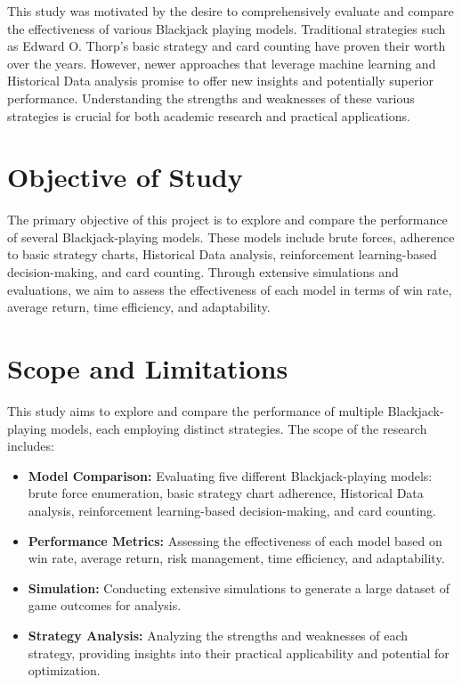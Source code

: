 \documentclass[a4paper,12pt]{report}
\begin{document}
This study was motivated by the desire to comprehensively evaluate and compare the effectiveness of various Blackjack playing models. Traditional strategies such as Edward O. Thorp's basic strategy and card counting have proven their worth over the years. However, newer approaches that leverage machine learning and Historical Data analysis promise to offer new insights and potentially superior performance. Understanding the strengths and weaknesses of these various strategies is crucial for both academic research and practical applications.

\section{Objective of Study} The primary objective of this project is to explore and compare the performance of several Blackjack-playing models. These models include brute forces, adherence to basic strategy charts, Historical Data analysis, reinforcement learning-based decision-making, and card counting. Through extensive simulations and evaluations, we aim to assess the effectiveness of each model in terms of win rate, average return, time efficiency, and adaptability.

\section{Scope and Limitations}
This study aims to explore and compare the performance of multiple Blackjack-playing models, each employing distinct strategies. The scope of the research includes:

\begin{itemize}
\item \textbf{Model Comparison:} Evaluating five different Blackjack-playing models: brute force enumeration, basic strategy chart adherence, Historical Data analysis, reinforcement learning-based decision-making, and card counting.
\item \textbf{Performance Metrics:} Assessing the effectiveness of each model based on win rate, average return, risk management, time efficiency, and adaptability.
\item \textbf{Simulation:} Conducting extensive simulations to generate a large dataset of game outcomes for analysis.
\item \textbf{Strategy Analysis:} Analyzing the strengths and weaknesses of each strategy, providing insights into their practical applicability and potential for optimization.
\end{itemize} 
\end{document}
